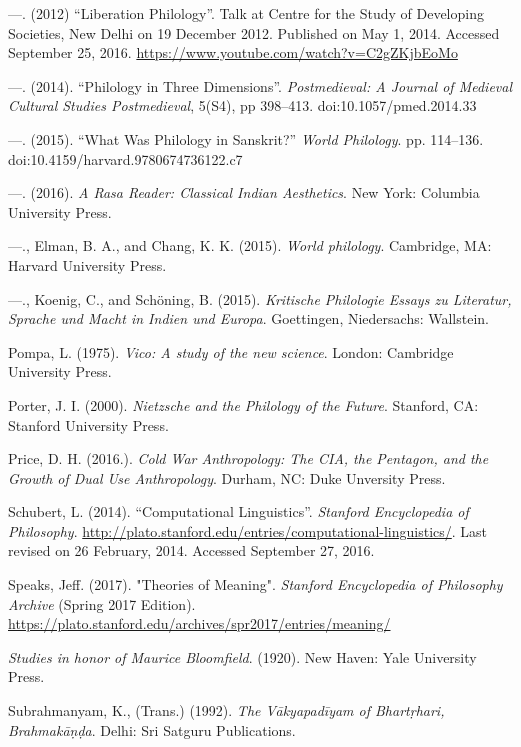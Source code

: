 \begin{thebibliography}{99}
  —. (2012) “Liberation Philology”. Talk at Centre for the Study of Developing Societies, New Delhi on 19 December 2012. Published on May 1, 2014. Accessed September 25, 2016. \url{https://www.youtube.com/watch?v=C2gZKjbEoMo}

  —. (2014). “Philology in Three Dimensions”. \textit{Postmedieval: A Journal of Medieval Cultural Studies Postmedieval}, 5(S4), pp 398--413. doi:10.1057/pmed.2014.33

  —. (2015). “What Was Philology in Sanskrit?” \textit{World Philology}. pp. 114--136. doi:10.4159/harvard.9780674736122.c7

  —. (2016). \textit{A Rasa Reader: Classical Indian Aesthetics}. New York: Columbia University Press.

  —., Elman, B. A., and Chang, K. K. (2015). \textit{World philology}. Cambridge, MA: Harvard University Press.

  —., Koenig, C., and Schöning, B. (2015). \textit{Kritische Philologie Essays zu Literatur, Sprache und Macht in Indien und Europa}. Goettingen, Niedersachs: Wallstein.

  Pompa, L. (1975). \textit{Vico: A study of the new science}. London: Cambridge University Press.

  Porter, J. I. (2000). \textit{Nietzsche and the Philology of the Future}. Stanford, CA: Stanford University Press.

  Price, D. H. (2016.). \textit{Cold War Anthropology: The CIA, the Pentagon, and the Growth of Dual Use Anthropology}. Durham, NC: Duke Unversity Press.

  Schubert, L. (2014). “Computational Linguistics”. \textit{Stanford Encyclopedia of Philosophy}. \url{http://plato.stanford.edu/entries/computational-linguistics/}. Last revised on 26 February, 2014. Accessed September 27, 2016.

  Speaks, Jeff. (2017). "Theories of Meaning". \textit{Stanford Encyclopedia of Philosophy Archive} (Spring 2017 Edition). \url{https://plato.stanford.edu/archives/spr2017/entries/meaning/}

  \textit{Studies in honor of Maurice Bloomfield}. (1920). New Haven: Yale University Press.

  Subrahmanyam, K., (Trans.) (1992). \textit{The Vākyapadīyam of Bhartṛhari, Brahmakāṇḍa}. Delhi: Sri Satguru Publications.


\end{thebibliography}
